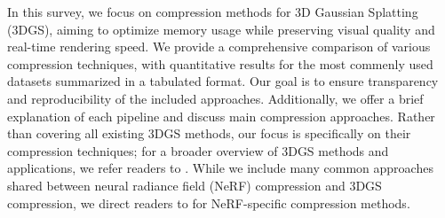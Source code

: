 \documentclass{article}
\begin{document}
In this survey, we focus on compression methods for 3D Gaussian Splatting (3DGS), aiming to optimize memory usage while preserving visual quality and real-time rendering speed. We provide a comprehensive comparison of various compression techniques, with quantitative results for the most commenly used datasets summarized in a tabulated format. Our goal is to ensure transparency and reproducibility of the included approaches. Additionally, we offer a brief explanation of each pipeline and discuss main compression approaches. Rather than covering all existing 3DGS methods, our focus is specifically on their compression techniques; for a broader overview of 3DGS methods and applications, we refer readers to \cite{wu2024recent,fei20243d}. While we include many common approaches shared between neural radiance field (NeRF)\cite{mildenhall2020nerf} compression and 3DGS compression, we direct readers to \cite{li2023compressing,chen2024far} for NeRF-specific compression methods.






\end{document}
